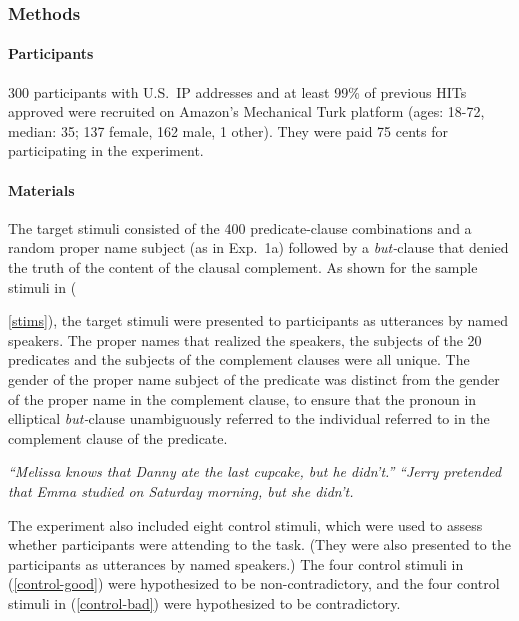 \documentclass[11pt,fleqn]{article}
\newcommand{\6}{\mbox{$[\hspace*{-.6mm}[$}}
\newcommand{\9}{\mbox{$]\hspace*{-.6mm}]$}}
\begin{document}
\subsubsection{Methods}

\paragraph{Participants} 300 participants with U.S.\ IP addresses and at least 99\% of previous HITs approved were recruited on Amazon's Mechanical Turk platform (ages: 18-72, median: 35; 137 female, 162 male, 1 other). They were paid 75 cents for participating in the experiment.

\paragraph{Materials} The target stimuli consisted of the 400 predicate-clause combinations and a random proper name subject (as in Exp.~1a) followed by a {\em but-}clause that denied the truth of the content of the clausal complement. As shown for the sample stimuli in ({\ref{stims}), the target stimuli were presented to participants as utterances by named speakers. The proper names that realized the speakers, the subjects of the 20 predicates and the subjects of the complement clauses were all unique. The gender of the proper name subject of the predicate was distinct from the gender of the proper name in the complement clause, to ensure that the pronoun in elliptical {\em but-}clause unambiguously referred to the individual referred to in the complement clause of the predicate.

\begin{exe}
\ex\label{stims}
\begin{xlist}
 {\em ``Melissa knows that Danny ate the last cupcake, but he didn't.''}
 {\em ``Jerry pretended that Emma studied on Saturday morning, but she didn't.}
\end{xlist}
\end{exe}

The experiment also included eight control stimuli, which were used to assess whether participants were attending to the task. (They were also presented to the participants as utterances by named speakers.) The four control stimuli in (\ref{control-good}) were hypothesized to be non-contradictory, and the four control stimuli in (\ref{control-bad}) were hypothesized to be contradictory.

}
\end{document}
